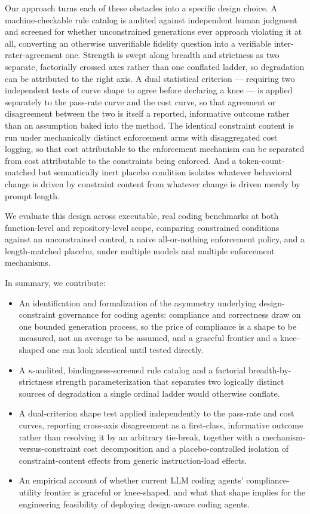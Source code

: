 \documentclass[11pt]{article}
\begin{document}
Our approach turns each of these obstacles into a specific design choice. A machine-checkable rule catalog is audited against independent human judgment and screened for whether unconstrained generations ever approach violating it at all, converting an otherwise unverifiable fidelity question into a verifiable inter-rater-agreement one. Strength is swept along breadth and strictness as two separate, factorially crossed axes rather than one conflated ladder, so degradation can be attributed to the right axis. A dual statistical criterion --- requiring two independent tests of curve shape to agree before declaring a knee --- is applied separately to the pass-rate curve and the cost curve, so that agreement or disagreement between the two is itself a reported, informative outcome rather than an assumption baked into the method. The identical constraint content is run under mechanically distinct enforcement arms with disaggregated cost logging, so that cost attributable to the enforcement mechanism can be separated from cost attributable to the constraints being enforced. And a token-count-matched but semantically inert placebo condition isolates whatever behavioral change is driven by constraint content from whatever change is driven merely by prompt length.

We evaluate this design across executable, real coding benchmarks at both function-level and repository-level scope, comparing constrained conditions against an unconstrained control, a naive all-or-nothing enforcement policy, and a length-matched placebo, under multiple models and multiple enforcement mechanisms.

In summary, we contribute:
\begin{itemize}[leftmargin=1.4em]
\item An identification and formalization of the asymmetry underlying design-constraint governance for coding agents: compliance and correctness draw on one bounded generation process, so the price of compliance is a shape to be measured, not an average to be assumed, and a graceful frontier and a knee-shaped one can look identical until tested directly.
\item A $\kappa$-audited, bindingness-screened rule catalog and a factorial breadth-by-strictness strength parameterization that separates two logically distinct sources of degradation a single ordinal ladder would otherwise conflate.
\item A dual-criterion shape test applied independently to the pass-rate and cost curves, reporting cross-axis disagreement as a first-class, informative outcome rather than resolving it by an arbitrary tie-break, together with a mechanism-versus-constraint cost decomposition and a placebo-controlled isolation of constraint-content effects from generic instruction-load effects.
\item An empirical account of whether current LLM coding agents' compliance-utility frontier is graceful or knee-shaped, and what that shape implies for the engineering feasibility of deploying design-aware coding agents.
\end{itemize}
\end{document}
